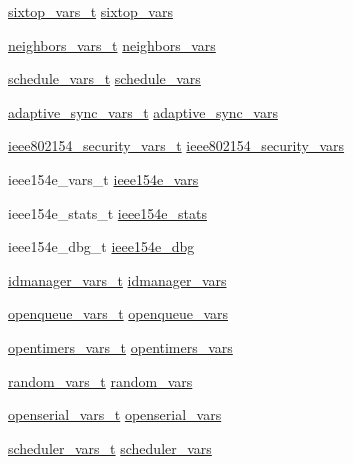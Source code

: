 \begin{DoxyCompactItemize}
\item 
\hyperlink{structsixtop__vars__t}{sixtop\+\_\+vars\+\_\+t} \hyperlink{struct_open_mote_ad24878ab2750f25cb31f1f1896df9129}{sixtop\+\_\+vars}
\item 
\hyperlink{structneighbors__vars__t}{neighbors\+\_\+vars\+\_\+t} \hyperlink{struct_open_mote_a6d24b1df68cebe6b4e30bf6606875e19}{neighbors\+\_\+vars}
\item 
\hyperlink{structschedule__vars__t}{schedule\+\_\+vars\+\_\+t} \hyperlink{struct_open_mote_a0e4d8d8851e795fcee51cabfe38259cd}{schedule\+\_\+vars}
\item 
\hyperlink{structadaptive__sync__vars__t}{adaptive\+\_\+sync\+\_\+vars\+\_\+t} \hyperlink{struct_open_mote_a46fd6d534d0e28197bdbd47463598890}{adaptive\+\_\+sync\+\_\+vars}
\item 
\hyperlink{structieee802154__security__vars__t}{ieee802154\+\_\+security\+\_\+vars\+\_\+t} \hyperlink{struct_open_mote_a2e1cf098b70a212c0137dcabf8a51326}{ieee802154\+\_\+security\+\_\+vars}
\item 
ieee154e\+\_\+vars\+\_\+t \hyperlink{struct_open_mote_ab16c29e7d0986128622698836ea1d01f}{ieee154e\+\_\+vars}
\item 
ieee154e\+\_\+stats\+\_\+t \hyperlink{struct_open_mote_aad80fcc3f8dc5dae8184c964a3ebcb77}{ieee154e\+\_\+stats}
\item 
ieee154e\+\_\+dbg\+\_\+t \hyperlink{struct_open_mote_a31e50da96e526495ff1c49873ae60ea9}{ieee154e\+\_\+dbg}
\item 
\hyperlink{structidmanager__vars__t}{idmanager\+\_\+vars\+\_\+t} \hyperlink{struct_open_mote_aee86d15881d8b0681a1f0c292536888c}{idmanager\+\_\+vars}
\item 
\hyperlink{structopenqueue__vars__t}{openqueue\+\_\+vars\+\_\+t} \hyperlink{struct_open_mote_a386f53172313c33476c0fb5de4daf54e}{openqueue\+\_\+vars}
\item 
\hyperlink{structopentimers__vars__t}{opentimers\+\_\+vars\+\_\+t} \hyperlink{struct_open_mote_ad90befaa4329ea1edce6ca5c2697e8b1}{opentimers\+\_\+vars}
\item 
\hyperlink{structrandom__vars__t}{random\+\_\+vars\+\_\+t} \hyperlink{struct_open_mote_ac39c7ed7d81f99bb3759327ecc34b020}{random\+\_\+vars}
\item 
\hyperlink{structopenserial__vars__t}{openserial\+\_\+vars\+\_\+t} \hyperlink{struct_open_mote_afd8c3a10c7a45dd24412299494f22dfd}{openserial\+\_\+vars}
\item 
\hyperlink{structscheduler__vars__t}{scheduler\+\_\+vars\+\_\+t} \hyperlink{struct_open_mote_a09fb00669f5bb4ac598ad50f789ea03c}{scheduler\+\_\+vars}

\end{DoxyCompactItemize}

